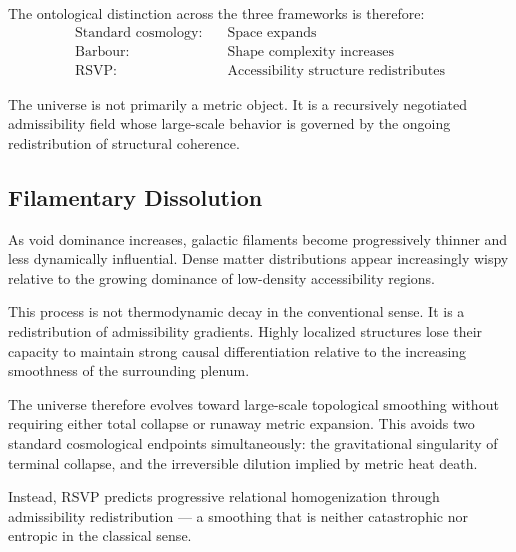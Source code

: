 \documentclass[12pt, a4paper]{article}
\begin{document}
The ontological distinction across the three frameworks is therefore:
\begin{align*}
\text{Standard cosmology:}&\quad \text{Space expands} \\
\text{Barbour:}&\quad \text{Shape complexity increases} \\
\text{RSVP:}&\quad \text{Accessibility structure redistributes}
\end{align*}

The universe is not primarily a metric object. It is a recursively
negotiated admissibility field whose large-scale behavior is governed by
the ongoing redistribution of structural coherence.

\subsection{Filamentary Dissolution}

As void dominance increases, galactic filaments become progressively thinner
and less dynamically influential. Dense matter distributions appear
increasingly wispy relative to the growing dominance of low-density
accessibility regions.

This process is not thermodynamic decay in the conventional sense.
It is a redistribution of admissibility gradients. Highly localized
structures lose their capacity to maintain strong causal differentiation
relative to the increasing smoothness of the surrounding plenum.

The universe therefore evolves toward large-scale topological smoothing
without requiring either total collapse or runaway metric expansion.
This avoids two standard cosmological endpoints simultaneously: the
gravitational singularity of terminal collapse, and the irreversible
dilution implied by metric heat death.

Instead, RSVP predicts progressive relational homogenization through
admissibility redistribution — a smoothing that is neither catastrophic
nor entropic in the classical sense.
\end{document}
